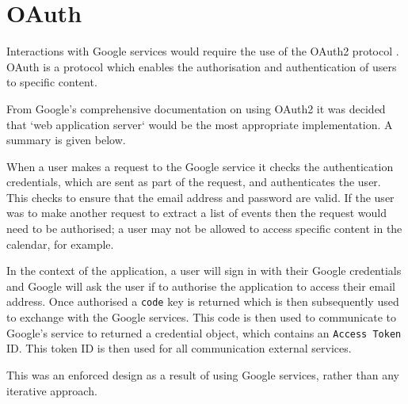 \section{OAuth} \label{design:oauth}
Interactions with Google services would require the use of the OAuth2 protocol \cite{citeulike:11836766}. OAuth is a protocol which enables the authorisation and authentication of users to specific content.

From Google's comprehensive documentation on using OAuth2 \cite{citeulike:14026287} it was decided that `web application server` would be the most appropriate implementation. A summary is given below.

When a user makes a request to the Google service it checks the authentication credentials, which are sent as part of the request, and authenticates the user. This checks to ensure that the email address and password are valid. If the user was to make another request to extract a list of events then the request would need to be authorised; a user may not be allowed to access specific content in the calendar, for example.

In the context of the application, a user will sign in with their Google credentials and Google will ask the user if to authorise the application to access their email address. Once authorised a \texttt{code} key is returned which is then subsequently used to exchange with the Google services. This code is then used to communicate to Google's service to returned a credential object, which contains an \texttt{Access Token} ID. This token ID is then used for all communication external services.

This was an enforced design as a result of using Google services, rather than any iterative approach.
